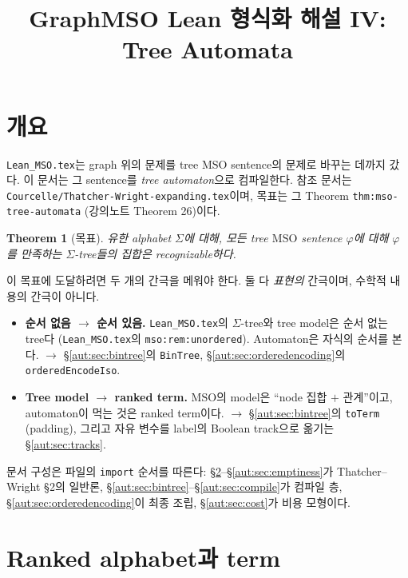 \documentclass[11pt]{article}
\title{GraphMSO Lean 형식화 해설 IV: Tree Automata}
\author{}
\date{}
\theoremstyle{definition}
\theoremstyle{plain}
\newtheorem{theorem}[definition]{Theorem}
\newcommand{\MSO}{\mathrm{MSO}}
\newcommand{\lean}[1]{\texttt{#1}}
\newcommand{\leanfile}[1]{\texttt{#1}}
\newcommand{\TW}{Thatcher--Wright}
\begin{document}
\maketitle

\tableofcontents

\section{개요}
\label{aut:sec:overview}

\leanfile{Lean\_MSO.tex}는 graph 위의 문제를 tree $\MSO$ sentence의 문제로
바꾸는 데까지 갔다. 이 문서는 그 sentence를 \emph{tree automaton}으로
컴파일한다. 참조 문서는 \leanfile{Courcelle/Thatcher-Wright-expanding.tex}이며,
목표는 그 Theorem \lean{thm:mso-tree-automata} (강의노트 Theorem 26)이다.

\begin{theorem}[목표]
\label{aut:thm:goal}
유한 alphabet $\Sigma$에 대해, 모든 tree $\MSO$ sentence $\varphi$에 대해
$\varphi$를 만족하는 $\Sigma$-tree들의 집합은 recognizable하다.
\end{theorem}

이 목표에 도달하려면 두 개의 간극을 메워야 한다. 둘 다 \emph{표현의} 간극이며,
수학적 내용의 간극이 아니다.

\begin{itemize}
  \item \textbf{순서 없음 $\to$ 순서 있음.} \leanfile{Lean\_MSO.tex}의
    $\Sigma$-tree와 tree model은 순서 없는 tree다
    (\leanfile{Lean\_MSO.tex}의 \lean{mso:rem:unordered}). Automaton은 자식의
    순서를 본다. $\to$ \S\ref{aut:sec:bintree}의 \lean{BinTree},
    \S\ref{aut:sec:orderedencoding}의 \lean{orderedEncodeIso}.
  \item \textbf{Tree model $\to$ ranked term.} $\MSO$의 model은 ``node 집합 $+$
    관계''이고, automaton이 먹는 것은 ranked term이다. $\to$
    \S\ref{aut:sec:bintree}의 \lean{toTerm} (padding), 그리고 자유 변수를
    label의 Boolean track으로 옮기는 \S\ref{aut:sec:tracks}.
\end{itemize}

문서 구성은 파일의 \lean{import} 순서를 따른다:
\S\ref{aut:sec:term}--\S\ref{aut:sec:emptiness}가 \TW{} \S2의 일반론,
\S\ref{aut:sec:bintree}--\S\ref{aut:sec:compile}가 컴파일 층,
\S\ref{aut:sec:orderedencoding}이 최종 조립, \S\ref{aut:sec:cost}가 비용
모형이다.

\section{Ranked alphabet과 term}
\label{aut:sec:term}
\end{document}
